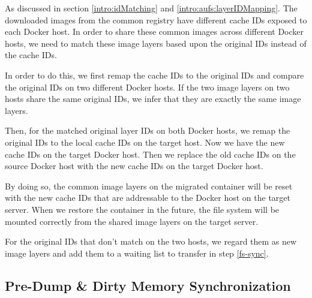 As discussed in section \ref{intro:idMatching} and \ref{intro:aufs:layerIDMapping}. The downloaded images from the common registry have different cache IDs exposed to each Docker host. In order to share these common images across different Docker hosts, we need to match these image layers based upon the original IDs instead of the cache IDs.

In order to do this, we first remap the cache IDs to the original IDs and compare the original IDs on two different Docker hosts. If the two image layers on two hosts share the same original IDs, we infer that they are exactly the same image layers. 

Then, for the matched original layer IDs on both Docker hosts, we remap the original IDs to the local cache IDs on the target host. Now we have the new cache IDs on the target Docker host. Then we replace the old cache IDs on the source Docker host with the new cache IDs on the target Docker host. 

By doing so, the common image layers on the migrated container will be reset with the new cache IDs that are addressable to the Docker host on the target server. When we restore the container in the future, the file system will be mounted correctly from the shared image layers on the target server.

 For the original IDs that don't match on the two hosts, we regard them as new image layers and add them to a waiting list to transfer in step \ref{fs-sync}.







\subsection{Pre-Dump \& Dirty Memory Synchronization} \label{design:memDiff}


